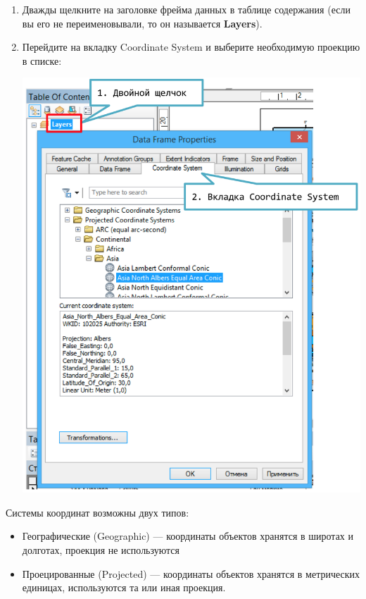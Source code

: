 \documentclass[12pt,]{book}
\begin{document}
\begin{enumerate}
\def\labelenumi{\arabic{enumi}.}
\item
  Дважды щелкните на заголовке фрейма данных в таблице содержания (если вы его не переименовывали, то он называется \textbf{Layers}).
\item
  Перейдите на вкладку Coordinate System и выберите необходимую проекцию в списке:

  \includegraphics{images/Appendix/image64.png}
\end{enumerate}

Системы координат возможны двух типов:

\begin{itemize}
\item
  Географические (Geographic) --- координаты объектов хранятся в широтах и долготах, проекция не используются
\item
  Проецированные (Projected) --- координаты объектов хранятся в метрических единицах, используются та или иная проекция.
\end{itemize}
\end{document}
